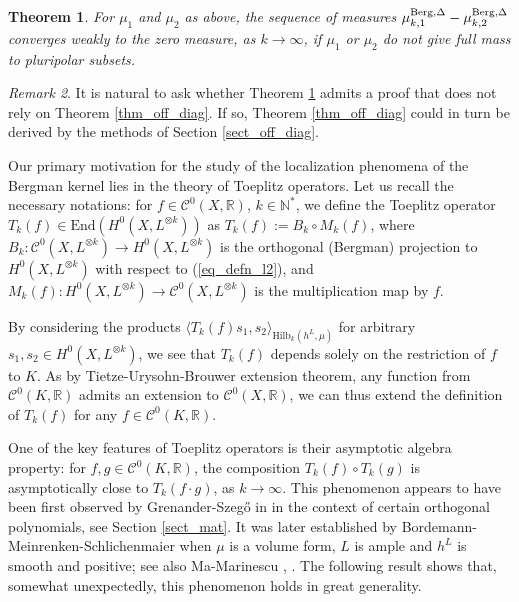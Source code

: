 \documentclass[12pt]{article}
\numberwithin{equation}{section}
\theoremstyle{theorem}
\newtheorem{thm}{Theorem}[section]
\theoremstyle{definition}
\theoremstyle{remark}
\newtheorem{rem}[thm]{Remark}
\newcommand{\real}{\mathbb{R}}
\newcommand{\nat}{\mathbb{N}}
\newcommand{\enmr}[1]{\text{End}{(#1)}}
\newcommand{\ccal}{\mathscr{C}}
\begin{document}
	\begin{thm}\label{thm_diag_local}
		For $\mu_1$ and $\mu_2$ as above, the sequence of measures $\mu_{k, 1}^{\rm{Berg}, \Delta} - \mu_{k, 2}^{\rm{Berg}, \Delta}$ converges weakly to the zero measure, as $k \to \infty$, if $\mu_1$ or $\mu_2$ do not give full mass to pluripolar subsets.
	\end{thm}
	\begin{rem}
		It is natural to ask whether Theorem \ref{thm_diag_local} admits a proof that does not rely on Theorem \ref{thm_off_diag}. 
		If so, Theorem \ref{thm_off_diag} could in turn be derived by the methods of Section \ref{sect_off_diag}.
	\end{rem}
	\par 
	Our primary motivation for the study of the localization phenomena of the Bergman kernel lies in the theory of Toeplitz operators.
	Let us recall the necessary notations: for $f \in \ccal^0(X, \real)$, $k \in \nat^*$, we define the Toeplitz operator $T_k(f) \in {\enmr{H^0(X, L^{\otimes k})}}$ as $T_k(f) := B_k \circ M_k(f)$, where $B_k : \ccal^0(X, L^{\otimes k}) \to H^0(X, L^{\otimes k})$ is the orthogonal (Bergman) projection to $H^0(X, L^{\otimes k})$ with respect to (\ref{eq_defn_l2}), and $M_k(f) : H^0(X, L^{\otimes k}) \to \ccal^0 (X, L^{\otimes k})$ is the multiplication map by $f$.
	\par 
	By considering the products $\langle T_k(f) s_1, s_2 \rangle_{{\textrm{Hilb}}_k(h^L, \mu)}$ for arbitrary $s_1, s_2 \in H^0(X, L^{\otimes k})$, we see that $T_k(f)$ depends solely on the restriction of $f$ to $K$.
	As by Tietze-Urysohn-Brouwer extension theorem, any function from $\ccal^0(K, \real)$ admits an extension to $\ccal^0(X, \real)$, we can thus extend the definition of $T_k(f)$ for any $f \in \ccal^0(K, \real)$.
	\par 
	One of the key features of Toeplitz operators is their asymptotic algebra property: for $f, g \in \ccal^0(K, \real)$, the composition $T_k(f) \circ T_k(g)$ is asymptotically close to $T_k(f \cdot g)$, as $k \to \infty$. 
	This phenomenon appears to have been first observed by Grenander-Szeg{\H{o}} in \cite[\S 7.4]{GrenanSzego} in the context of certain orthogonal polynomials, see Section \ref{sect_mat}. 
	It was later established by Bordemann-Meinrenken-Schlichenmaier \cite{BordMeinSchli} when $\mu$ is a volume form, $L$ is ample and $h^L$ is smooth and positive; see also Ma-Marinescu \cite{MaMarToepl}, \cite{MaMarBTKah}. 
	The following result shows that, somewhat unexpectedly, this phenomenon holds in great generality.
\end{document}
